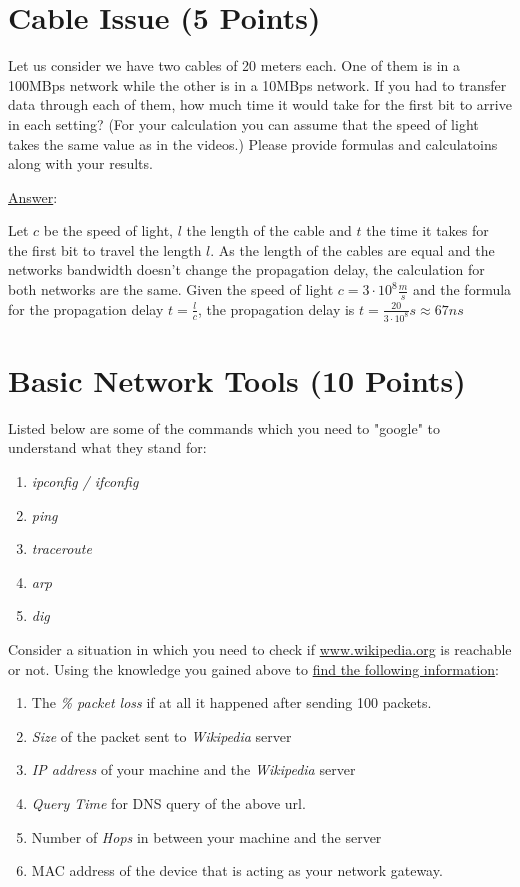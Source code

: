 \documentclass[12pt]{article}
\begin{document}
\section{Cable Issue (5 Points)}

Let us consider we have two cables of 20 meters each. One of them is in a 100MBps network while the other is in a 10MBps network. If you had to transfer data through each of them, how much time it would take for the first bit to arrive in each setting? (For your calculation you can assume that the speed of light takes the same value as in the videos.) Please provide formulas and calculatoins along with your results.

\underline{Answer}:

Let $c$ be the speed of light, $l$ the length of the cable and $t$ the time it takes for the first bit to travel the length $l$. 
As the length of the cables are equal and the networks bandwidth doesn't change the propagation delay, the calculation for both networks are the same.  
Given the speed of light $c = 3 \cdot 10^8 \frac{m}{s}$ and the formula for the propagation delay $t = \frac{l}{c}$, the propagation delay is $t = \frac{20}{3 \cdot 10^8}s \approx 67ns$

\section{Basic Network Tools (10 Points)}

Listed below are some of the commands which you need to "google" to understand what they stand for:
\begin{enumerate}
	\item \emph{ipconfig / ifconfig}
	\item \emph{ping}
	\item \emph{traceroute}
	\item \emph{arp}
	\item \emph{dig}
\end{enumerate}

Consider a situation in which you need to check if \url{www.wikipedia.org} is reachable or not. Using the knowledge you gained above to \underline{find the following information}:
\begin{enumerate}
	\itemsep0em
	\item The \emph{\% packet loss} if at all it happened after sending 100 packets.
	\item \emph{Size} of the packet sent to \emph{Wikipedia} server
	\item \emph{IP address} of your machine and the \emph{Wikipedia} server
	\item \emph{Query Time} for DNS query of the above url.
	\item Number of \emph{Hops} in between your machine and the server
	\item MAC address of the device that is acting as your network gateway.
\end{enumerate}
\end{document}
